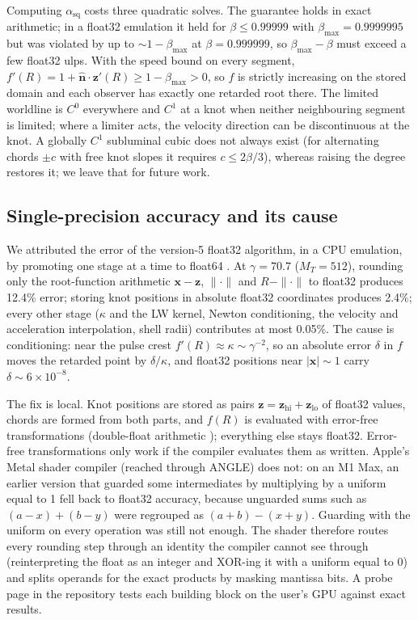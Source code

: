 \documentclass[11pt, a4paper]{article}
\begin{document}
Computing $\alpha_{\text{sq}}$ costs three quadratic solves. The guarantee holds in exact arithmetic; in a float32 emulation it held for $\beta \le 0.99999$ with $\beta_{\max} = 0.9999995$ but was violated by up to $\sim\!1 - \beta_{\max}$ at $\beta = 0.999999$, so $\beta_{\max} - \beta$ must exceed a few float32 ulps. With the speed bound on every segment, $f'(R) = 1 + \hat{\mathbf{n}}\cdot\mathbf{z}'(R) \ge 1 - \beta_{\max} > 0$, so $f$ is strictly increasing on the stored domain and each observer has exactly one retarded root there. The limited worldline is $C^0$ everywhere and $C^1$ at a knot when neither neighbouring segment is limited; where a limiter acts, the velocity direction can be discontinuous at the knot. A globally $C^1$ subluminal cubic does not always exist (for alternating chords $\pm c$ with free knot slopes it requires $c \le 2\beta/3$), whereas raising the degree restores it; we leave that for future work.

\subsection{Single-precision accuracy and its cause}\label{sec:precision}
We attributed the error of the version-5 float32 algorithm, in a CPU emulation, by promoting one stage at a time to float64 \cite{swarm2026}. At $\gamma = 70.7$ ($M_T = 512$), rounding only the root-function arithmetic $\mathbf{x} - \mathbf{z}$, $\|\cdot\|$ and $R - \|\cdot\|$ to float32 produces 12.4\% error; storing knot positions in absolute float32 coordinates produces 2.4\%; every other stage ($\kappa$ and the LW kernel, Newton conditioning, the velocity and acceleration interpolation, shell radii) contributes at most 0.05\%. The cause is conditioning: near the pulse crest $f'(R) \approx \kappa \sim \gamma^{-2}$, so an absolute error $\delta$ in $f$ moves the retarded point by $\delta/\kappa$, and float32 positions near $|\mathbf{x}| \sim 1$ carry $\delta \sim 6\times10^{-8}$.

The fix is local. Knot positions are stored as pairs $\mathbf{z} = \mathbf{z}_{\text{hi}} + \mathbf{z}_{\text{lo}}$ of float32 values, chords are formed from both parts, and $f(R)$ is evaluated with error-free transformations (double-float arithmetic \cite{thall2006, dagraca2006}); everything else stays float32. Error-free transformations only work if the compiler evaluates them as written. Apple's Metal shader compiler (reached through ANGLE) does not: on an M1 Max, an earlier version that guarded some intermediates by multiplying by a uniform equal to 1 fell back to float32 accuracy, because unguarded sums such as $(a - x) + (b - y)$ were regrouped as $(a + b) - (x + y)$. Guarding with the uniform on every operation was still not enough. The shader therefore routes every rounding step through an identity the compiler cannot see through (reinterpreting the float as an integer and XOR-ing it with a uniform equal to 0) and splits operands for the exact products by masking mantissa bits. A probe page in the repository tests each building block on the user's GPU against exact results.
\end{document}
